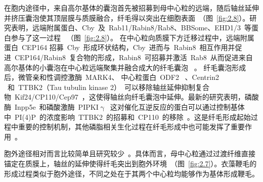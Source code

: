 在胞内途径中，来自高尔基体的囊泡首先被招募到母中心粒的远端，随后轴丝延伸并挤压囊泡使其顶层膜与质膜融合，纤毛得以突出在细胞表面\ \citep{Sorokin1962,Sorokin1968}（图\ \ref{fig:2.8}）。研究表明，远端附属蛋白、Cby\ 及\ Rab11/Rabin8/Rab8、BBSome、EHD1/3\ 等蛋白参与了这一过程
\ \citep{Burke2014,Lu2015,Westlake2011,Nachury2007,Knodler2010,Zhang2012}（图\ \ref{fig:2.8}）。 在中心粒向质膜下方迁移过程中，远端附属蛋白\ CEP164
招募\ Cby\
形成环状结构，Cby\ 进而与\ Rabin8\
相互作用并促进\ CEP164/Rabin8\ 复合物的形成，Rabin8\
可招募并激活\ Rab8\ 从而促进来自高尔基体的小囊泡在中心粒远端聚集并融合成大的纤毛囊泡
\ \citep{Burke2014,Schmidt2012}。 纤毛囊泡形成后，微管亲和性调控激酶\ MARK4、 中心粒蛋白\ ODF2
\ \citep{Kuhns2013}、Centrin2 \citep{Prosser2015}\ 和\ TTBK2（Tau tubulin kinase 2）\citep{Goetz2012}\ 可以移除轴丝延伸抑制复合物\ Kif24/CP110/Cep97\
\citep{Spektor2007,Tsang2008,Tsang2013,Kobayashi2011}，这使得轴丝向纤毛囊泡中延伸。最新的研究表明，磷酸酶\ Inpp5e\ 和磷酸激酶\ PIPKI$\upgamma$\ 这对催化互逆反应的蛋白可以通过控制基体中\ PI(4)P\
的浓度影响\ TTBK2\ 的招募和\ CP110\
的移除\ \citep{Xu2016a}。这是纤毛形成起始过程中重要的控制机制，其他磷脂相关生化过程在纤毛形成中也可能发挥了重要作用\ \citep{Xu2016a}。

胞外途径相对而言比较简单且研究较少\ \citep{Benmerah2013}。具体而言，母中心粒通过过渡纤维直接锚定在质膜上，轴丝的延伸使得纤毛突出到胞外环境\ \citep{Benmerah2013}（图\ \ref{fig:2.7}）。衣藻鞭毛的形成过程类似于胞外途径，不同之处在于其两个中心粒均能够作为基体形成鞭毛。

